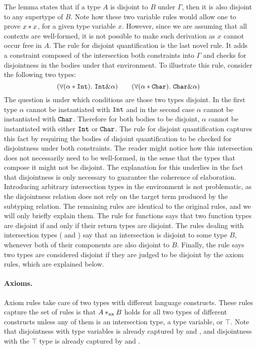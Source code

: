 The lemma states that if a type $A$ is disjoint to $B$ under $\Gamma$, then it is also disjoint
to any supertype of $B$. 
Note how these two variable rules would allow one to prove $x * x$, for a given type 
variable $x$.
However, since we are assuming that all contexts are well-formed, it is not possible to make
such derivation as $x$ cannot occur free in $A$. 
The rule for disjoint quantification  is the last novel rule. 
It adds a constraint composed of the intersection both constraints into $\Gamma$ and checks for 
disjointness in the bodies under that environment.
To illustrate this rule, consider the following two types:
\[ (\forall (\alpha * \texttt{Int}).~\texttt{Int} \& \alpha) \qquad 
(\forall (\alpha * \texttt{Char}). ~\texttt{Char} \& \alpha) \]
The question is under which conditions are those two types disjoint.
In the first type $\alpha$ cannot be instantiated with $\texttt{Int}$ and in
the second case $\alpha$ cannot be instantiated with $\texttt{Char}$.
Therefore for both bodies to be disjoint, $\alpha$ cannot be instantiated with either $\texttt{Int}$ 
or $\texttt{Char}$. 
The rule for disjoint quantification captures this fact by requiring the bodies of disjoint 
quantification to be checked for disjointness under both constraints.
The reader might notice how this intersection does not necessarily need to be well-formed,
in the sense that the types that compose it might not be disjoint.
The explanation for this underlies in the fact that disjointness is only necessary to guarantee
the coherence of elaboration.
Introducing arbitrary intersection types in the environment is not problematic, as the disjointness
relation does not rely on the target term produced by the subtyping relation.
The remaining rules are identical to the original rules, and we will only briefly explain them.
The rule for functions  says that two function
types are disjoint if and only if their return types are disjoint. 
The rules dealing with intersection types (
and ) say that an intersection is disjoint to some type $B$, whenever
both of their components are also disjoint to $B$.
Finally, the rule  says two types are considered disjoint if they are
judged to be disjoint by the axiom rules, which are explained below.

\paragraph{Axioms.} Axiom rules take care of two types with different language constructs.
These rules capture the set of rules is that $A *_\textnormal{ax} B$ holds for all 
two types of different constructs unless any of them is an intersection type, a type variable,
or $\top$.
Note that disjointness with type variables is already captured by  and 
, and disjointness with the $\top$ type is already captured by 
{} and {}.

